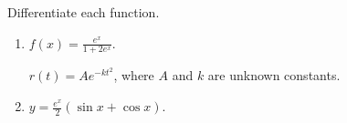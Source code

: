 Differentiate each function.  

\begin{enumerate}
\item   $\displaystyle f(x) = \frac{e^x}{1+2e^x}$.  

  $r(t) = Ae^{-kt^2}$, where $A$ and $k$ are unknown constants.  

%

\item   $y = \frac{e^x}{2}(\sin x + \cos x)$.  
\end{enumerate}
